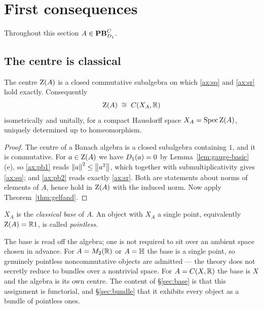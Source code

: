 \section{First consequences}
\label{sec:consequences}

Throughout this section $A\in\mathbf{PB}^C_{D_1}$.

\subsection{The centre is classical}

\begin{theorem}\label{thm:base}
The centre $\operatorname{Z}(A)$ is a closed commutative subalgebra on which \eqref{ax:sq}
and \eqref{ax:sr} hold exactly.  Consequently
\[
  \operatorname{Z}(A)\;\cong\;C(X_A,\mathbb{R})
\]
isometrically and unitally, for a compact Hausdorff space
$X_A=\operatorname{Spec}\operatorname{Z}(A)$, uniquely determined up to homeomorphism.
\end{theorem}

\begin{proof}
The centre of a Banach algebra is a closed subalgebra containing $1$, and it is
commutative.  For $a\in\operatorname{Z}(A)$ we have $D_1(a)=0$ by
Lemma~\ref{lem:gauge-basic}(e), so \eqref{ax:pb1} reads
$\left\lVert a\right\rVert^2\le\left\lVert a^2\right\rVert$, which together with submultiplicativity gives
\eqref{ax:sq}; and \eqref{ax:pb2} reads exactly \eqref{ax:sr}.  Both are
statements about norms of elements of $A$, hence hold in $\operatorname{Z}(A)$ with the
induced norm.  Now apply Theorem~\ref{thm:gelfand}.
\end{proof}

\begin{definition}\label{def:base}
$X_A$ is the \emph{classical base} of $A$.  An object with $X_A$ a single
point, equivalently $\operatorname{Z}(A)=\mathbb{R}1$, is called \emph{pointless}.
\end{definition}

\begin{remark}\label{rem:extracted}
The base is read off the algebra; one is not required to sit over an ambient
space chosen in advance.  For $A=M_2(\mathbb{R})$ or $A=\mathbb{H}$ the base is a single
point, so genuinely pointless noncommutative objects are admitted --- the
theory does not secretly reduce to bundles over a nontrivial space.  For
$A=C(X,\mathbb{R})$ the base is $X$ and the algebra is its own centre.  The content of
\S\ref{sec:base} is that this assignment is functorial, and \S\ref{sec:bundle}
that it exhibits every object as a bundle of pointless ones.
\end{remark}

